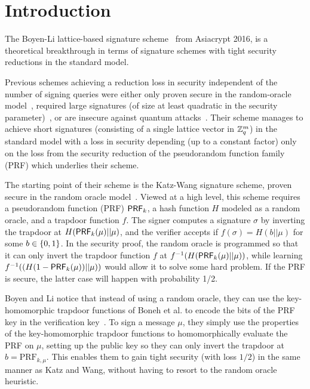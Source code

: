 \section{Introduction}
\label{sec:intro}
The Boyen-Li lattice-based signature scheme~\cite{DBLP:conf/asiacrypt/BoyenL16} from Asiacrypt 2016, is a theoretical breakthrough in terms of signature schemes with tight security reductions in the standard model. 

Previous schemes achieving a reduction loss in security independent of the number of signing queries were either only proven secure in the random-oracle model~\cite{DBLP:conf/ccs/KatzW03,DBLP:journals/joc/BonehLS04}, required large signatures (of size at least quadratic in the security parameter)~\cite{DBLP:conf/pkc/BlazyKKP15}, or are insecure against quantum attacks~\cite{DBLP:conf/crypto/ChenW13,DBLP:conf/eurocrypt/GennaroHR99,DBLP:journals/joc/BonehB08}. Their scheme manages to achieve short signatures (consisting of a single lattice vector in $\mathbb{Z}_q^{m}$) in the standard model with a loss in security depending (up to a constant factor) only on the loss from the security reduction of the pseudorandom function family (PRF) which underlies their scheme.

The starting point of their scheme is the Katz-Wang signature scheme, proven secure in the random oracle model~\cite{DBLP:conf/ccs/KatzW03}. Viewed at a high level, this scheme requires a pseudorandom function (PRF) $\mathsf{PRF}_k$, a hash function $H$ modeled as a random oracle, and a trapdoor function $f$. The signer computes a signature $\sigma$ by  inverting the trapdoor at $H(\mathsf{PRF}_{k}(\mu) ||\mu)$, and the verifier accepts if $f(\sigma)=H(b || \mu)$ for some $b \in \{0,1\}$. In the security proof, the random oracle is programmed so that it can only invert the trapdoor function $f$ at $f^{-1}(H(\mathsf{PRF}_{k}(\mu) || \mu))$, while learning $f^{-1}((H(1-\mathsf{PRF}_{k}(\mu)) || \mu))$ would allow it to solve some hard problem. If the PRF is secure, the latter case will happen with probability 1/2.

Boyen and Li notice that instead of using a random oracle, they can use the key-homomorphic trapdoor functions of Boneh et al. to encode the bits of the PRF key in the verification key~\cite{DBLP:conf/eurocrypt/BonehGGHNSVV14}. To sign a message $\mu$, they simply use the properties of the key-homomorphic trapdoor functions to homomorphically evaluate the PRF on $\mu$, setting up the public key so they can only invert the trapdoor at $b=\text{PRF}_{k,\mu}$. This enables them to gain tight security (with loss $1/2$) in the same manner as Katz and Wang, without having to resort to the random oracle heuristic. 

